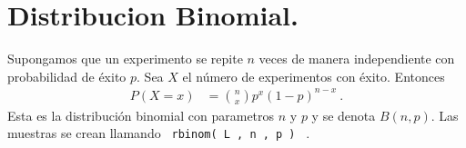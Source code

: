 \documentclass[12pt,reqno]{amsart}\usepackage[]{graphicx}\usepackage[]{color}
\begin{document}

\section{Distribucion Binomial.}
Supongamos que un experimento se repite $n$ veces de manera independiente con probabilidad de éxito $p$. Sea $X$ el número de experimentos con éxito. Entonces
\begin{equation}\label{dbinomial}
  \begin{split}
    P(X=x) &= { n \choose x } p^{x} (1-p)^{n-x}\:.
  \end{split}
\end{equation}
Esta es la distribución binomial con parametros $n$ y $p$ y se denota $B(n,p)$. Las muestras se crean llamando \verb+ rbinom( L , n , p ) + .
\end{document}
